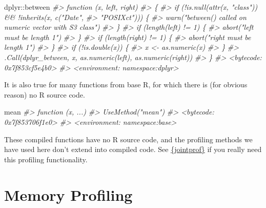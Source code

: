 \documentclass[
  12pt,
]{book}
\newenvironment{Shaded}{\begin{snugshade}}{\end{snugshade}}
\newcommand{\CommentTok}[1]{\textcolor[rgb]{0.56,0.35,0.01}{\textit{#1}}}
\newcommand{\NormalTok}[1]{#1}
\newcommand{\SpecialCharTok}[1]{\textcolor[rgb]{0.00,0.00,0.00}{#1}}
\begin{document}
\begin{Shaded}
\begin{Highlighting}[]
\NormalTok{dplyr}\SpecialCharTok{::}\NormalTok{between}
\CommentTok{\#\textgreater{} function (x, left, right) }
\CommentTok{\#\textgreater{} \{}
\CommentTok{\#\textgreater{}     if (!is.null(attr(x, "class")) \&\& !inherits(x, c("Date", }
\CommentTok{\#\textgreater{}         "POSIXct"))) \{}
\CommentTok{\#\textgreater{}         warn("between() called on numeric vector with S3 class")}
\CommentTok{\#\textgreater{}     \}}
\CommentTok{\#\textgreater{}     if (length(left) != 1) \{}
\CommentTok{\#\textgreater{}         abort("\textasciigrave{}left\textasciigrave{} must be length 1")}
\CommentTok{\#\textgreater{}     \}}
\CommentTok{\#\textgreater{}     if (length(right) != 1) \{}
\CommentTok{\#\textgreater{}         abort("\textasciigrave{}right\textasciigrave{} must be length 1")}
\CommentTok{\#\textgreater{}     \}}
\CommentTok{\#\textgreater{}     if (!is.double(x)) \{}
\CommentTok{\#\textgreater{}         x \textless{}{-} as.numeric(x)}
\CommentTok{\#\textgreater{}     \}}
\CommentTok{\#\textgreater{}     .Call(dplyr\_between, x, as.numeric(left), as.numeric(right))}
\CommentTok{\#\textgreater{} \}}
\CommentTok{\#\textgreater{} \textless{}bytecode: 0x7f853cf5e4b0\textgreater{}}
\CommentTok{\#\textgreater{} \textless{}environment: namespace:dplyr\textgreater{}}
\end{Highlighting}
\end{Shaded}

It is also true for many functions from base R, for which there is (for obvious reason) no R source code.

\begin{Shaded}
\begin{Highlighting}[]
\NormalTok{mean}
\CommentTok{\#\textgreater{} function (x, ...) }
\CommentTok{\#\textgreater{} UseMethod("mean")}
\CommentTok{\#\textgreater{} \textless{}bytecode: 0x7f853706f1e0\textgreater{}}
\CommentTok{\#\textgreater{} \textless{}environment: namespace:base\textgreater{}}
\end{Highlighting}
\end{Shaded}

These compiled functions have no R source code, and the profiling methods we have used here don't extend into compiled code. See \href{https://github.com/r-prof/jointprof}{\{jointprof\}} if you really need this profiling functionality.

\hypertarget{memory-profiling}{%
\section{Memory Profiling}\label{memory-profiling}}
\end{document}
